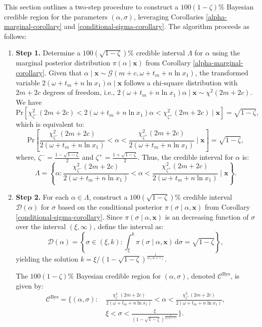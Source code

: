 \documentclass[twoside]{article}
\begin{document}
This section outlines a two-step procedure to construct a $100(1 - \zeta)\%$ Bayesian credible region for the parameters $(\alpha, \sigma)$, leveraging Corollaries \ref{alpha-marginal-corollary} and \ref{conditional-sigma-corollary}. The algorithm proceeds as follows:
\begin{enumerate}
	\item[] \textbf{Step 1.}
	Determine a $100(\sqrt{1 - \zeta})\%$ credible interval \(\Lambda\) for \(\alpha\) using the marginal posterior distribution \(\pi(\alpha \mid \mathbf{x})\) from Corollary \ref{alpha-marginal-corollary}. Given that \(\alpha \mid \mathbf{x} \sim \mathcal{G}(m + c , \omega + t_m+n\ln x_1)\), the transformed variable $2(\omega + t_m+n\ln x_1)\alpha \mid \mathbf{x}$ follows a chi-square distribution with $2m + 2c$ degrees of freedom, i.e., $2(\omega + t_m+n\ln x_1)\alpha \mid \mathbf{x} \sim \chi^2(2m + 2c)$. We have
	\[
	\text{Pr}\left[\chi^2_{\zeta^-}(2m + 2c) < 2(\omega + t_m+n\ln x_1)\alpha < \chi^2_{\zeta^+}(2m + 2c) \mid \mathbf{x}\right] = \sqrt{1 - \zeta},
	\]
	which is equivalent to:
	\[
	\text{Pr}\left[\frac{\chi^2_{\zeta^-}(2m + 2c)}{2(\omega + t_m+n\ln x_1)} < \alpha < \frac{\chi^2_{\zeta^+}(2m + 2c)}{2(\omega + t_m+n\ln x_1)} \mid \mathbf{x}\right] = \sqrt{1 - \zeta},
	\]
	where, $\zeta^-=\frac{1-\sqrt{1-\zeta}}{2}$ and $\zeta^+=\frac{1+\sqrt{1-\zeta}}{2}$.
	Thus, the credible interval for $\alpha$ is:
	\[
	\Lambda = \left\{\alpha : \frac{\chi^2_{\zeta^-}(2m + 2c)}{2(\omega + t_m+n\ln x_1)} < \alpha < \frac{\chi^2_{\zeta^+}(2m + 2c)}{2(\omega + t_m+n\ln x_1)} \mid \mathbf{x}\right\}.
	\]
	\item[] \textbf{Step 2.}
	For each $\alpha \in \Lambda$, construct a $100(\sqrt{1 - \zeta})\%$ credible interval $\mathcal{D}(\alpha)$ for $\sigma$ based on the conditional posterior $\pi(\sigma \mid \alpha, \mathbf{x})$ from Corollary \ref{conditional-sigma-corollary}. Since $\pi(\sigma \mid \alpha, \mathbf{x})$ is an decreasing function of $\sigma$ over the interval $(\xi, \infty)$, define the interval as:
	\[
	\mathcal{D}(\alpha) = \left\{\sigma \in (\xi, k) : \int_\xi^k \pi(\sigma \mid \alpha, \mathbf{x}) \, \mathrm{d}\sigma = \sqrt{1 - \zeta}\right\},
	\]
	yielding the solution $k = \xi/ \left(1 - \sqrt{1 - \zeta}\right)^{\frac{1}{\alpha(n + \gamma)}}$.
	
	The $100(1-\zeta)\%$ Bayesian credible region for $(\alpha, \sigma)$, denoted $\mathcal{C}^{\text{Bys}}$, is given by:
	\begin{align}
		\mathcal{C}^{\text{Bys}} = \Biggl\{ (\alpha, \sigma):~& \frac{\chi^2_{\zeta^-}(2m+2c)}{2(\omega + t_m+n\ln x_1)} < \alpha < \frac{\chi^2_{\zeta^+}(2m+2c)}{2(\omega + t_m+n\ln x_1)},\nonumber \\
		& \xi< \sigma < \frac{\xi}{ \left(1 - \sqrt{1 - \zeta}\right)^{\frac{1}{\alpha(n + \gamma)}}} \Biggr\}.\label{BS-Eq-region1}	
	\end{align}
\end{enumerate}
\end{document}
